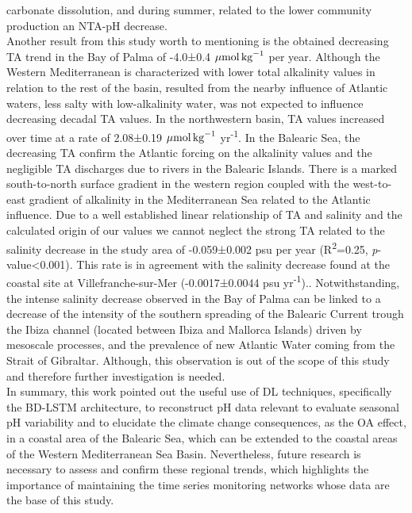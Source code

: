 carbonate dissolution\cite{barron2006organic,cossarini2015spatiotemporal}, and
during summer, related to the lower community
production\cite{champenois2012seasonal} an NTA-pH
decrease\cite{cossarini2015spatiotemporal}. \\
Another result from this study worth to mentioning is the obtained
decreasing TA trend in the Bay of Palma of -4.0±0.4 ${\mu
            \textrm{mol\,kg}^{-1}}$ per year. Although the Western
Mediterranean is
characterized with lower total alkalinity values in relation to the rest of the
basin, resulted from the nearby influence of Atlantic waters, less salty with
low-alkalinity water\cite{RIVARO2010236,hassoun2015modeling}, was not expected
to influence decreasing decadal TA values. In the northwestern basin, TA values
increased over time at a rate of 2.08±0.19 ${\mu \textrm{mol\,kg}^{-1}}$
yr\textsuperscript{-1}. In the Balearic Sea, the decreasing TA confirm the
Atlantic forcing on the alkalinity values and the negligible TA discharges due
to rivers in the Balearic Islands. There is a marked south-to-north surface
gradient in the western region coupled with the west-to-east gradient of
alkalinity in the Mediterranean Sea related to the Atlantic
influence\cite{cossarini2015spatiotemporal,Gemayel2015}. Due to a well
established linear relationship of TA and
salinity\cite{schneider2007alkalinity} and the calculated origin of our
values\cite{Gemayel2015} we cannot neglect the strong TA related to the
salinity decrease in the study area of -0.059±0.002 psu per year
(R\textsuperscript{2}=0.25, \emph{p}-value<0.001). This rate is in agreement
with the salinity decrease found at the coastal site at Villefranche-sur-Mer
(-0.0017±0.0044 psu yr\textsuperscript{-1}).\cite{Kapsenberg2017}.
Notwithstanding, the intense salinity decrease observed in the Bay of Palma can
be linked to a decrease of the intensity of the southern spreading of the
Balearic Current trough the Ibiza channel (located between Ibiza and Mallorca
Islands) driven by mesoscale processes, and the prevalence of new Atlantic
Water coming from the Strait of Gibraltar\cite{millot1999circulation}.
Although, this observation is out of the scope of this study and therefore
further investigation is needed.\\
In summary, this work pointed out the useful use of DL techniques,
specifically the BD-LSTM architecture, to reconstruct pH data relevant to
evaluate seasonal pH variability and to elucidate the climate change
consequences, as the OA effect, in a coastal area of the Balearic Sea, which
can be extended to the coastal areas of the Western Mediterranean Sea Basin.
Nevertheless, future research is necessary to assess and confirm these regional
trends, which highlights the importance of maintaining the time series
monitoring networks whose data are the base of this study.

